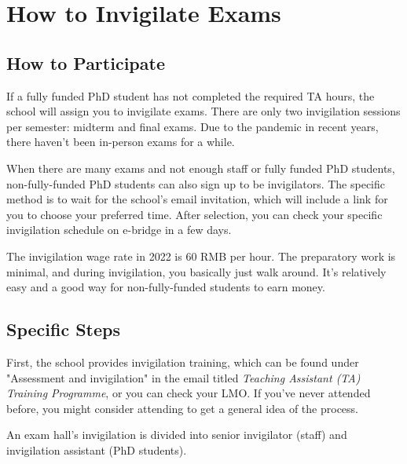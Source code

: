 \section{How to Invigilate Exams}

\subsection{How to Participate}
If a fully funded PhD student has not completed the required TA hours, the school will assign you to invigilate exams. There are only two invigilation sessions per semester: midterm and final exams. Due to the pandemic in recent years, there haven't been in-person exams for a while.

When there are many exams and not enough staff or fully funded PhD students, non-fully-funded PhD students can also sign up to be invigilators. The specific method is to wait for the school's email invitation, which will include a link for you to choose your preferred time. After selection, you can check your specific invigilation schedule on e-bridge in a few days.

The invigilation wage rate in 2022 is 60 RMB per hour. The preparatory work is minimal, and during invigilation, you basically just walk around. It's relatively easy and a good way for non-fully-funded students to earn money.

\subsection{Specific Steps}
First, the school provides invigilation training, which can be found under "Assessment and invigilation" in the email titled \textit{Teaching Assistant (TA) Training Programme}, or you can check your LMO. If you've never attended before, you might consider attending to get a general idea of the process.

An exam hall's invigilation is divided into senior invigilator (staff) and invigilation assistant (PhD students).

